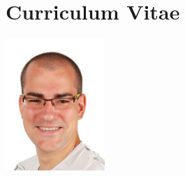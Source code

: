 \chapter{Curriculum Vitae} \label{ch:currvita}

\vspace*{-1cm}
\hfill\includegraphics[height=5cm]{bilder/peter.jpg}
\vspace*{-5cm}

